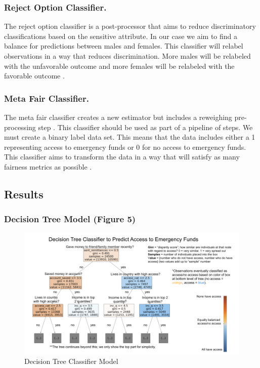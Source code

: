 \documentclass[water,article,submit,moreauthors,pdftex]{mdpi}
\begin{document}
\hypertarget{reject-option-classifier.}{%
\subsubsection{Reject Option
Classifier.}\label{reject-option-classifier.}}

The reject option classifier is a post-processor that aims to reduce
discriminatory classifications based on the sensitive attribute. In our
case we aim to find a balance for predictions between males and females.
This classifier will relabel observations in a way that reduces
discrimination. More males will be relabeled with the unfavorable
outcome and more females will be relabeled with the favorable outcome
\citep{kamiran2012decision}.

\hypertarget{meta-fair-classifier.}{%
\subsubsection{Meta Fair Classifier.}\label{meta-fair-classifier.}}

The meta fair classifier creates a new estimator but includes a
reweighing pre-processing step \citep{celis2019classification}. This
classifier should be used as part of a pipeline of steps. We must create
a binary label data set. This means that the data includes either a 1
representing access to emergency funds or 0 for no access to emergency
funds. This classifier aims to transform the data in a way that will
satisfy as many fairness metrics as possible
\citep{agarwal2018reductions}.

\hypertarget{results}{%
\subsection{Results}\label{results}}

\hypertarget{decision-tree-model-figure-5}{%
\subsubsection{Decision Tree Model (Figure
5)}\label{decision-tree-model-figure-5}}

\begin{figure}
\centering
\includegraphics[width=\textwidth,height=0.5\textheight]{images/decision_tree_annotated.png}
\caption{Decision Tree Classifier Model}
\end{figure}
\end{document}
